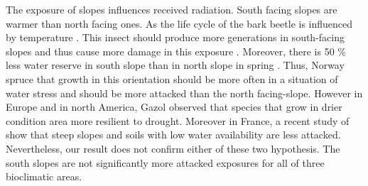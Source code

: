 \documentclass[3p,procedia]{elsarticle}
\begin{document}
The exposure of slopes influences received radiation.
South facing slopes are warmer than north facing ones.
As the life cycle of the bark beetle is influenced by temperature \citep{baier_phenipscomprehensive_2007}.
This insect should produce more generations in south-facing slopes and thus cause  more damage in this exposure \citep{jakus_1995}.
Moreover, there is 50 \% less water reserve in south slope than in north slope in spring \citep{Rouse_1969}. 
Thus, Norway spruce that growth in this orientation should be more often in a situation of water stress and should be more attacked than the north facing-slope.
However in Europe and in north America, Gazol \citep{gazol_2017} observed that species that grow in drier condition area more resilient to drought.
Moreover in France, a recent study of \cite{nardi_drought_2022} show that steep slopes and soils with low water availability are less attacked.
Nevertheless, our result does not confirm either of these two hypothesis.
The south slopes are not significantly more attacked exposures for all of three bioclimatic areas.
 

\end{document}
